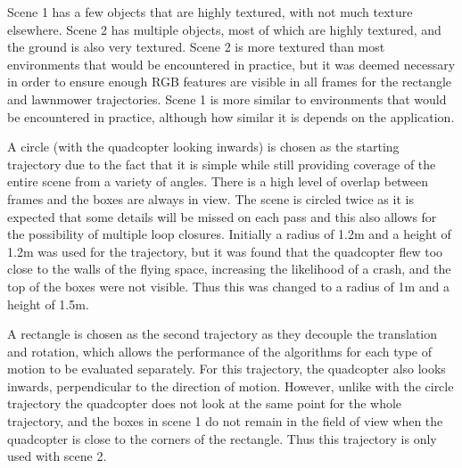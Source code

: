 \documentclass[12pt,a4paper]{article}
\begin{document}

    Scene 1 has a few objects that are highly textured, with not much texture elsewhere. Scene 2 has multiple objects, most of which are highly textured, and the ground is also very textured. Scene 2 is more textured than most environments that would be encountered in practice, but it was deemed necessary in order to ensure enough RGB features are visible in all frames for the rectangle and lawnmower trajectories. Scene 1 is more similar to environments that would be encountered in practice, although how similar it is depends on the application. 
     
    A circle (with the quadcopter looking inwards) is chosen as the starting trajectory due to the fact that it is simple while still providing coverage of the entire scene from a variety of angles. There is a high level of overlap between frames and the boxes are always in view. The scene is circled twice as it is expected that some details will be missed on each pass and this also allows for the possibility of multiple loop closures. Initially a radius of 1.2m and a height of 1.2m was used for the trajectory, but it was found that the quadcopter flew too close to the walls of the flying space, increasing the likelihood of a crash, and the top of the boxes were not visible. Thus this was changed to a radius of 1m and a height of 1.5m.
     
    A rectangle is chosen as the second trajectory as they decouple the translation and rotation, which allows the performance of the algorithms for each type of motion to be evaluated separately. For this trajectory, the quadcopter also looks inwards, perpendicular to the direction of motion. However, unlike with the circle trajectory the quadcopter does not look at the same point for the whole trajectory, and the boxes in scene 1 do not remain in the field of view when the quadcopter is close to the corners of the rectangle. Thus this trajectory is only used with scene 2.
    
\end{document}
